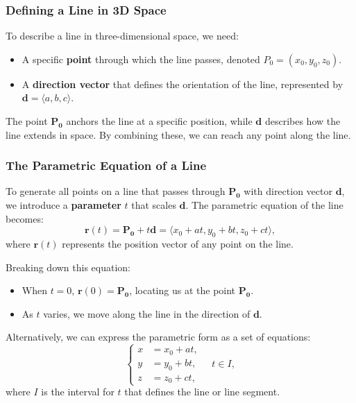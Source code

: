 \subsubsection*{Defining a Line in 3D Space}

\noindent To describe a line in three-dimensional space, we need:
\begin{itemize}
    \item A specific \textbf{point} through which the line passes, denoted \( P_0 = (x_0, y_0, z_0) \).
    \item A \textbf{direction vector} that defines the orientation of the line, represented by \( \mathbf{d} = \langle a, b, c \rangle \).
\end{itemize}

\noindent The point \( \mathbf{P_0} \) anchors the line at a specific position, while \( \mathbf{d} \) describes how the line extends in space. By combining these, we can reach any point along the line.

\subsubsection*{The Parametric Equation of a Line}

\noindent To generate all points on a line that passes through \( \mathbf{P_0} \) with direction vector \( \mathbf{d} \), we introduce a \textbf{parameter} \( t \) that scales \( \mathbf{d} \). The parametric equation of the line becomes:
\[
\mathbf{r}(t) = \mathbf{P_0} + t \mathbf{d} = \langle x_0 + at, y_0 + bt, z_0 + ct \rangle,
\]
where \( \mathbf{r}(t) \) represents the position vector of any point on the line.

\noindent Breaking down this equation:
\begin{itemize}
    \item When \( t = 0 \), \( \mathbf{r}(0) = \mathbf{P_0} \), locating us at the point \( \mathbf{P_0} \).
    \item As \( t \) varies, we move along the line in the direction of \( \mathbf{d} \).
\end{itemize}

\noindent Alternatively, we can express the parametric form as a set of equations:
\[
\left\{
\begin{aligned}
    x &= x_0 + at, \\
    y &= y_0 + bt, \\
    z &= z_0 + ct,
\end{aligned}
\right.
\quad t \in I,
\]
where \( I \) is the interval for \( t \) that defines the line or line segment.

